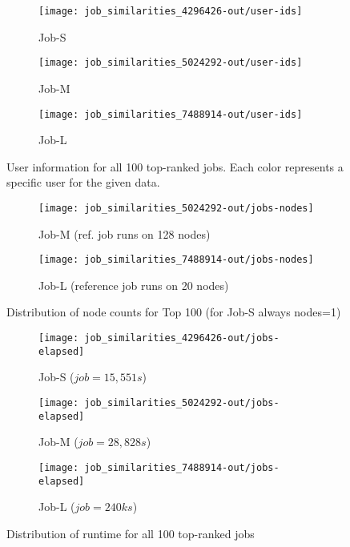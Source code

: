 \documentclass{jhps}
\begin{document}
\begin{figure}[bt]
\begin{subfigure}{0.48\textwidth}
\centering
\texttt{[image: job\_similarities\_4296426-out/user-ids]}
\caption{Job-S}\label{fig:users-job-S}
\end{subfigure}
\begin{subfigure}{0.48\textwidth}
\centering
\texttt{[image: job\_similarities\_5024292-out/user-ids]}
\caption{Job-M}\label{fig:users-job-M}
\end{subfigure}
\begin{subfigure}{0.48\textwidth}
\centering
\texttt{[image: job\_similarities\_7488914-out/user-ids]}
\caption{Job-L}\label{fig:users-job-L}
\end{subfigure}

\caption{User information for all 100 top-ranked jobs. Each color represents a specific user for the given data.}
\label{fig:userids}
\end{figure}

\begin{figure}
\begin{subfigure}{0.48\textwidth}
\centering
\texttt{[image: job\_similarities\_5024292-out/jobs-nodes]}
\caption{Job-M (ref. job runs on 128 nodes)}\label{fig:nodes-job-M}
\end{subfigure}
\begin{subfigure}{0.48\textwidth}
\centering
\texttt{[image: job\_similarities\_7488914-out/jobs-nodes]}
\caption{Job-L (reference job runs on 20 nodes)}\label{fig:nodes-job-L}
\end{subfigure}
\centering
\caption{Distribution of node counts for Top 100 (for Job-S always nodes=1)}%
\label{fig:nodes-job}
\end{figure}

\begin{figure}
\begin{subfigure}{0.7\textwidth}
\centering
\texttt{[image: job\_similarities\_4296426-out/jobs-elapsed]}
\caption{Job-S ($job=15,551s$)}\label{fig:runtime-job-S}
\end{subfigure}
\begin{subfigure}{0.7\textwidth}
\centering
\texttt{[image: job\_similarities\_5024292-out/jobs-elapsed]}
\caption{Job-M ($job=28,828s$)}\label{fig:runtime-job-M}
\end{subfigure}
\begin{subfigure}{0.7\textwidth}
\centering
\texttt{[image: job\_similarities\_7488914-out/jobs-elapsed]}
\caption{Job-L ($job=240ks$)}\label{fig:runtime-job-L}
\end{subfigure}
\centering
\caption{Distribution of runtime for all 100 top-ranked jobs}%
\label{fig:runtime-job}
\end{figure}
\end{document}

